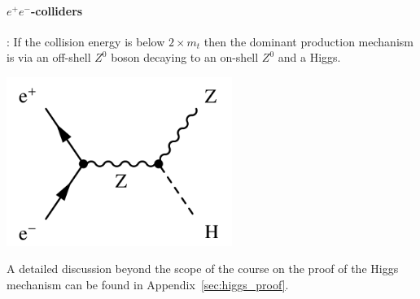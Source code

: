 \paragraph{$e^+e^-$-colliders}:
If the collision energy is below $2\times m_{t}$ then the dominant production mechanism is via an off-shell $Z^0$ boson decaying to an on-shell $Z^0$ and a Higgs.
\begin{center}
\includegraphics[width=0.55\textwidth]{fig/higgs/higgs_strahlung.png}
\end{center}

A detailed discussion beyond the scope of the course on the proof of the Higgs mechanism
can be found in Appendix~\ref{sec:higgs_proof}.
